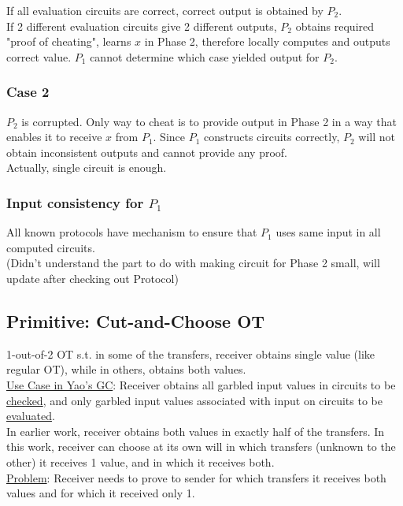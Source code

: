 If all evaluation circuits are correct, correct output is obtained by $P_2$.\\

If 2 different evaluation circuits give 2 different outputs, $P_2$ obtains required "proof of cheating", learns $x$ in Phase 2, therefore locally computes and outputs correct value. $P_1$ cannot determine which case yielded output for $P_2$.

\subsubsection{Case 2}
$P_2$ is corrupted. Only way to cheat is to provide output in Phase 2 in a way that enables it to receive $x$ from $P_1$. Since $P_1$ constructs circuits correctly, $P_2$ will not obtain inconsistent outputs and cannot provide any proof.\\

Actually, single circuit is enough.

\subsubsection{Input consistency for $P_1$}
All known protocols have mechanism to ensure that $P_1$ uses same input in all computed circuits. \\

(Didn't understand the part to do with making circuit for Phase 2 small, will update after checking out Protocol)

\subsection{Primitive: Cut-and-Choose OT}
1-out-of-2 OT s.t. in some of the transfers, receiver obtains single value (like regular OT), while in others, obtains both values. \\

\underline{Use Case in Yao's GC}: Receiver obtains all garbled input values in circuits to be \underline{checked}, and only garbled input values associated with input on circuits to be \underline{evaluated}. \\

In earlier work, receiver obtains both values in exactly half of the transfers. In this work, receiver can choose at its own will in which transfers (unknown to the other) it receives 1 value, and in which it receives both. \\

\underline{Problem}: Receiver needs to prove to sender for which transfers it receives both values and for which it received only 1. \\

